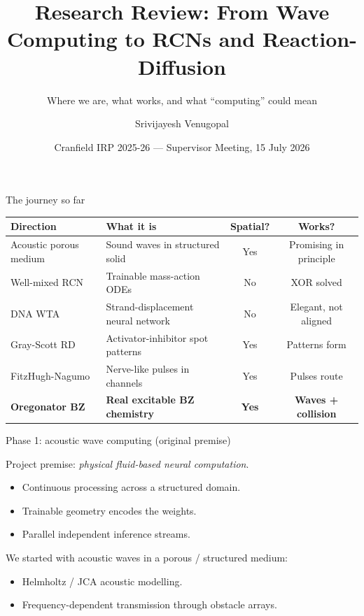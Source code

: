 \documentclass[aspectratio=169,11pt]{beamer}
\title{Research Review: From Wave Computing to RCNs and Reaction-Diffusion}
\subtitle{Where we are, what works, and what ``computing'' could mean}
\author{Srivijayesh Venugopal}
\date{Cranfield IRP 2025-26 --- Supervisor Meeting, 15 July 2026}
\begin{document}
\begin{frame}
\titlepage
\end{frame}


\begin{frame}{The journey so far}

\begin{table}
\centering
\footnotesize
\begin{tabular}{p{2.6cm}p{5.5cm}cc}
\toprule
\textbf{Direction} & \textbf{What it is} & \textbf{Spatial?} & \textbf{Works?} \\
\midrule
Acoustic porous medium & Sound waves in structured solid & Yes & Promising in principle \\
Well-mixed RCN & Trainable mass-action ODEs & No & XOR solved \\
DNA WTA & Strand-displacement neural network & No & Elegant, not aligned \\
Gray-Scott RD & Activator-inhibitor spot patterns & Yes & Patterns form \\
FitzHugh-Nagumo & Nerve-like pulses in channels & Yes & Pulses route \\
\textbf{Oregonator BZ} & \textbf{Real excitable BZ chemistry} & \textbf{Yes} & \textbf{Waves + collision} \\
\bottomrule
\end{tabular}
\end{table}

\end{frame}

\begin{frame}{Phase 1: acoustic wave computing (original premise)}

Project premise: \textit{physical fluid-based neural computation}.

\vspace{0.3cm}
\begin{itemize}
    \item Continuous processing across a structured domain.
    \item Trainable geometry encodes the weights.
    \item Parallel independent inference streams.
\end{itemize}

\vspace{0.3cm}
We started with acoustic waves in a porous / structured medium:
\begin{itemize}
    \item Helmholtz / JCA acoustic modelling.
    \item Frequency-dependent transmission through obstacle arrays.
\end{itemize}

\end{frame}
\end{document}
